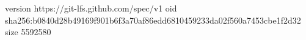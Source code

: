 version https://git-lfs.github.com/spec/v1
oid sha256:b0840d28b49169f901b6f3a70af86edd6810459233da02f560a7453cbe1f2d32
size 5592580
